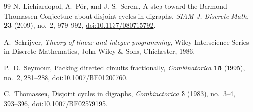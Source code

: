 \documentclass[a4paper,12pt]{article}
\numberwithin{equation}{section}
\begin{document}
\begin{thebibliography}{99}
N.~Lichiardopol, A.~P\'{o}r, and J.-S.~Sereni,
A step toward the Bermond--Thomassen Conjecture about disjoint
cycles in digraphs,
\emph{SIAM J. Discrete Math.} \textbf{23} (2009),
no.~2, 979--992,
\href{https://doi.org/10.1137/080715792}{doi:10.1137/080715792}.


A.~Schrijver, \emph{Theory of linear and integer programming},
Wiley-Interscience Series in Discrete Mathematics,
John Wiley \& Sons, Chichester, 1986.


P.~D.~Seymour, Packing directed circuits fractionally,
\emph{Combinatorica} \textbf{15} (1995), no.~2, 281--288,
\href{https://doi.org/10.1007/BF01200760}{doi:10.1007/BF01200760}.


C.~Thomassen,
Disjoint cycles in digraphs,
\emph{Combinatorica} \textbf{3} (1983),
no.~3--4, 393--396,
\href{https://doi.org/10.1007/BF02579195}{doi:10.1007/BF02579195}.



\end{thebibliography}







\end{document}
